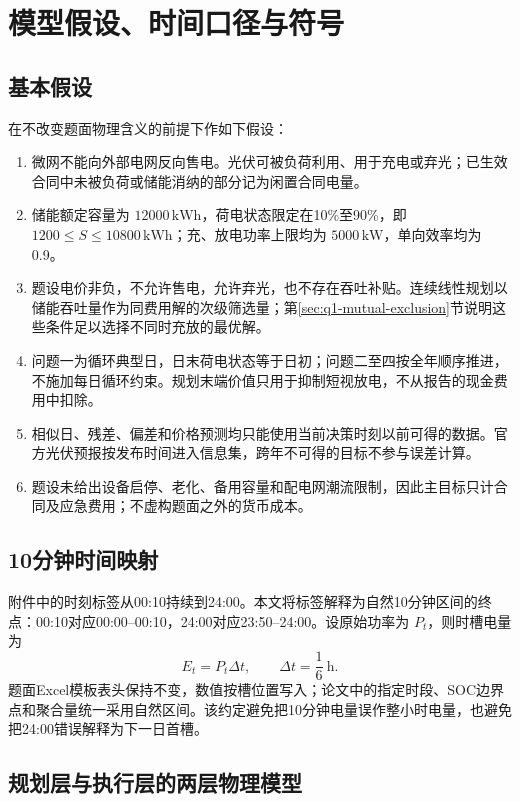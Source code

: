\section{模型假设、时间口径与符号}

\subsection{基本假设}

在不改变题面物理含义的前提下作如下假设：
\begin{enumerate}[label=（\arabic*）]
  \item 微网不能向外部电网反向售电。光伏可被负荷利用、用于充电或弃光；已生效合同中未被负荷或储能消纳的部分记为闲置合同电量。
  \item 储能额定容量为 $12000\,\mathrm{kWh}$，荷电状态限定在10\%至90\%，即 $1200\le S\le10800\,\mathrm{kWh}$；充、放电功率上限均为 $5000\,\mathrm{kW}$，单向效率均为0.9。
  \item 题设电价非负，不允许售电，允许弃光，也不存在吞吐补贴。连续线性规划以储能吞吐量作为同费用解的次级筛选量；第\ref{sec:q1-mutual-exclusion}节说明这些条件足以选择不同时充放的最优解。
  \item 问题一为循环典型日，日末荷电状态等于日初；问题二至四按全年顺序推进，不施加每日循环约束。规划末端价值只用于抑制短视放电，不从报告的现金费用中扣除。
  \item 相似日、残差、偏差和价格预测均只能使用当前决策时刻以前可得的数据。官方光伏预报按发布时间进入信息集，跨年不可得的目标不参与误差计算。
  \item 题设未给出设备启停、老化、备用容量和配电网潮流限制，因此主目标只计合同及应急费用；不虚构题面之外的货币成本。
\end{enumerate}

\subsection{10分钟时间映射}

附件中的时刻标签从00:10持续到24:00。本文将标签解释为自然10分钟区间的终点：00:10对应00:00--00:10，24:00对应23:50--24:00。设原始功率为 $P_t$，则时槽电量为
\begin{equation}
 E_t=P_t\Delta t,\qquad \Delta t=\frac16\ \mathrm h .
 \label{eq:power-energy}
\end{equation}
题面Excel模板表头保持不变，数值按槽位置写入；论文中的指定时段、SOC边界点和聚合量统一采用自然区间。该约定避免把10分钟电量误作整小时电量，也避免把24:00错误解释为下一日首槽。

\subsection{规划层与执行层的两层物理模型}

